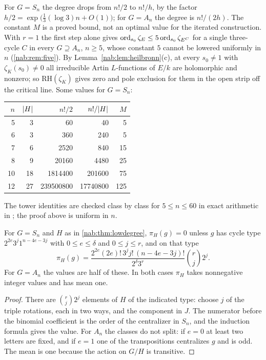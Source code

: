 For $G=S_n$ the degree drops from $n!/2$ to $n!/h$, by the factor
$h/2=\exp\bigl(\tfrac13(\log3)n+O(1)\bigr)$; for $G=A_n$ the degree is $n!/(2h)$. The constant
$M$ is a proved bound, not an optimal value for the iterated construction. With $r=1$ the
first step alone gives $\operatorname{ord}_{s_0}\zeta_E\le5\operatorname{ord}_{s_0}\zeta_{E^C}$ for a single three-cycle $C$
in every $G\supseteq A_n$, $n\ge5$, whose constant $5$ cannot be lowered uniformly in $n$ (\cref{nab:rem:five}). By
Lemma~\ref{nab:lem:heilbronn}(c), at every $s_0\ne1$ with $\zeta_K(s_0)\ne0$ all irreducible
Artin $L$-functions of $E/k$ are holomorphic and nonzero; so $\mathrm{RH}(\zeta_K)$ gives zero and
pole exclusion for them in the open strip off the critical line. Some values for $G=S_n$:
\begin{center}
\begin{tabular}{rrrrr}\toprule
$n$&$\lvert H\rvert$&$n!/2$&$n!/\lvert H\rvert$&$M$\\\midrule
5&3&60&40&5\\
6&3&360&240&5\\
7&6&2520&840&15\\
8&9&20160&4480&25\\
10&18&1814400&201600&75\\
12&27&239500800&17740800&125\\\bottomrule
\end{tabular}
\end{center}
The tower identities are checked class by class for $5\le n\le60$ in exact arithmetic in
; the proof above is
uniform in $n$.

\begin{proposition}\label{nab:prop:lowweight}
For $G=S_n$ and $H$ as in \cref{nab:thm:lowdegree}, $\pi_H(g)=0$ unless $g$ has cycle type
$2^{2e}3^j1^{n-4e-3j}$ with $0\le e\le\delta$ and $0\le j\le r$, and on that type
\[
 \pi_H(g)=\frac{2^{2e}(2e)!\,3^jj!\,(n-4e-3j)!}{2^\delta3^r}\binom rj2^j .
\]
For $G=A_n$ the values are half of these. In both cases $\pi_H$ takes nonnegative integer
values and has mean one.
\end{proposition}
\begin{proof}
There are $\binom rj2^j$ elements of $H$ of the indicated type: choose $j$ of the triple
rotations, each in two ways, and the component in $J$. The numerator before the binomial
coefficient is the order of the centralizer in $S_n$, and the induction formula gives the
value. For $A_n$ the classes do not split: if $e=0$ at least two letters are fixed, and if
$e=1$ one of the transpositions centralizes $g$ and is odd. The mean is one because the
action on $G/H$ is transitive.
\end{proof}

